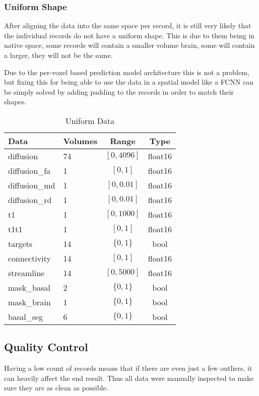 \subsubsection{Uniform Shape}
After aligning the data into the same space per record, it is still very likely that the individual records do not have a uniform shape. This is due to them being in native space, some records will contain a smaller volume brain, some will contain a larger, they will not be the same.\par
Due to the per-voxel based prediction model architecture this is not a problem, but fixing this for being able to use the data in a spatial model like a \ac{FCNN} can be simply solved by adding padding to the records in order to match their shapes.
\begin{table}[H]
\centering
\begin{tabular}{|l|l|c|c|}
\hline
\textbf{Data} & \textbf{Volumes} & \textbf{Range} & \textbf{Type} \\ \hline
diffusion & 74 & $[0,4096]$ & float16 \\ \hline
diffusion\_fa & 1 & $[0,1]$ & float16 \\ \hline
diffusion\_md & 1 & $[0,0.01]$ & float16 \\ \hline
diffusion\_rd & 1 & $[0,0.01]$ & float16 \\ \hline
t1 & 1 & $[0,1000]$ & float16 \\ \hline
t1t1 & 1 & $[0,1]$ & float16 \\ \hline
targets & 14 & $\{0,1\}$ & bool \\ \hline
connectivity & 14 & $[0,1]$ & float16 \\ \hline
streamline & 14 & $[0,5000]$ & float16 \\ \hline
mask\_basal & 2 & $\{0,1\}$ & bool \\ \hline
mask\_brain & 1 & $\{0,1\}$ & bool \\ \hline
basal\_seg & 6 & $\{0,1\}$ & bool \\ \hline
\end{tabular}
\caption{Uniform Data}
\label{tab:datas2}
\end{table}

\subsection{Quality Control}

Having a low count of records means that if there are even just a few outliers, it can heavily affect the end result. Thus all data were manually inspected to make sure they are as clean as possible.

